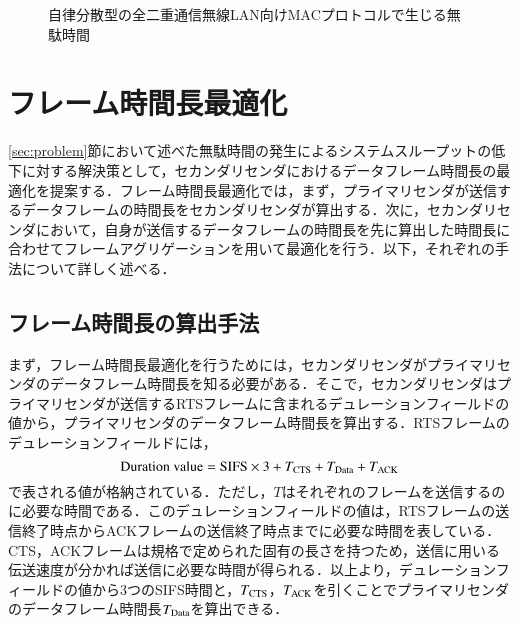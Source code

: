 \documentclass[technicalreport]{ieicej}
\begin{document}
	\begin{figure}
		\centering
		\caption{自律分散型の全二重通信無線LAN向けMACプロトコルで生じる無駄時間}
		\label{fig:problem}
	\end{figure}

\section{フレーム時間長最適化\label{sec:opt}}
\ref{sec:problem}節において述べた無駄時間の発生によるシステムスループットの低下に対する解決策として，セカンダリセンダにおけるデータフレーム時間長の最適化を提案する．フレーム時間長最適化では，まず，プライマリセンダが送信するデータフレームの時間長をセカンダリセンダが算出する．次に，セカンダリセンダにおいて，自身が送信するデータフレームの時間長を先に算出した時間長に合わせてフレームアグリゲーションを用いて最適化を行う．以下，それぞれの手法について詳しく述べる．

	\subsection{フレーム時間長の算出手法}
	まず，フレーム時間長最適化を行うためには，セカンダリセンダがプライマリセンダのデータフレーム時間長を知る必要がある．そこで，セカンダリセンダはプライマリセンダが送信するRTSフレームに含まれるデュレーションフィールドの値から，プライマリセンダのデータフレーム時間長を算出する．RTSフレームのデュレーションフィールドには，
	\begin{equation}
		{\rm Duration\ value} = {\rm SIFS}\times 3 + T_{\rm CTS} + T_{\rm Data} + T_{\rm ACK}
	\end{equation}
	で表される値が格納されている．ただし，$T$はそれぞれのフレームを送信するのに必要な時間である．このデュレーションフィールドの値は，RTSフレームの送信終了時点からACKフレームの送信終了時点までに必要な時間を表している．CTS，ACKフレームは規格で定められた固有の長さを持つため，送信に用いる伝送速度が分かれば送信に必要な時間が得られる．以上より，デュレーションフィールドの値から3つのSIFS時間と，$T_{\rm CTS}$，$T_{\rm ACK}$を引くことでプライマリセンダのデータフレーム時間長$T_{\rm Data}$を算出できる．
\end{document}

